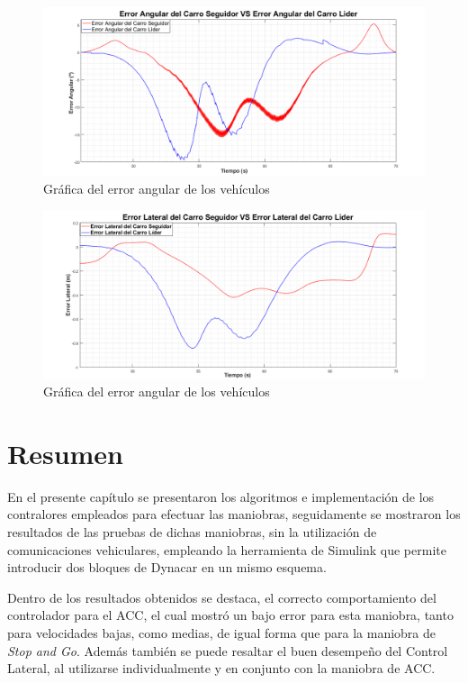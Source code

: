 \begin{figure}[H]
	\centering
		\includegraphics[scale=0.35]{Imagenes/acsea}
		\caption{Gráfica del error angular de los vehículos}
		\label{fig:acsea}
\end{figure}	

\begin{figure}[H]
	\centering
		\includegraphics[scale=0.35]{Imagenes/acsel}
		\caption{Gráfica del error angular de los vehículos}
		\label{fig:acsel}
\end{figure}	


\section{Resumen}

En el presente capítulo se presentaron los algoritmos e implementación de los contralores empleados para efectuar las maniobras, seguidamente se mostraron los resultados de las pruebas de dichas maniobras, sin la utilización de comunicaciones vehiculares, empleando la herramienta de Simulink que permite introducir dos bloques de Dynacar en un mismo esquema.\\

\par  Dentro de los resultados obtenidos se destaca, el correcto comportamiento del controlador para el ACC, el cual mostró un bajo error para esta maniobra, tanto para velocidades bajas, como medias, de igual forma que para la maniobra de \textit{Stop and Go}. Además también se puede resaltar el buen desempeño del Control Lateral, al utilizarse individualmente y en conjunto con la maniobra de ACC.